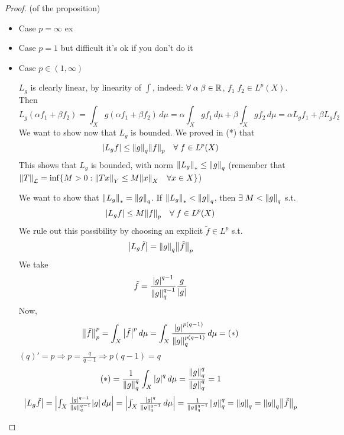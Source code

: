 \begin{proof}
    (of the proposition)
    \begin{itemize}
        \item Case \(p=\infty\) ex
        \item Case \(p=1\) but difficult it's ok if you don't do it
        \item Case \(p \in (1, \infty)\)
        
        \(L_g\) is clearly linear, by linearity of \(\int\), indeed:
        \(\forall \; \alpha \; \beta \in \mathbb{R}\), \(f_1 \; f_2 \in L^p(X)\). Then
        \[
            L_g(\alpha f_1 + \beta f_2) = \int_X g (\alpha f_1 + \beta f_2) \, d\mu = \alpha \int_X g f_1 \, d\mu + \beta \int_X g f_2 \, d\mu = \alpha L_g f_1 + \beta L_g f_2
        \]
        We want to show now that \(L_g \) is bounded. 
        We proved in (*) that 
        \[
            \abs{L_g f} \leq \norm{g}_{{q}} \norm{f}_p \quad \forall \; f \in L^p(X)
        \]
        This shows that \(L_g\) is bounded, with norm  \(\norm{L_g}_* \leq \norm{g}_{{q}}\) (remember that \(\norm{T}_\mathcal{L} = \inf \{ M>0: \norm{Tx} _Y \leq M \norm{x}_X \quad \forall x \in X\} \))

        We want to show that \(\norm{L_g}_* = \norm{g}_{{q}}\). If \(\norm{L_g}_* < \norm{g}_{{q}}\), then \(\exists \; M < \norm{g}_{{q}}\) s.t. 
        \[
            \abs{L_g f } \leq M \norm{f}_p \quad \forall \; f \in L^p(X)
        \]
        We rule out this possibility by choosing an explicit \(\tilde{f} \in L^p \) s.t.
        \[
            \abs{L_g \tilde{f} } = \norm{g}_{{q}} \norm{\tilde{f}}_p
        \]
        We take 
        \[
            \tilde{f} = \frac{\abs{g}^{{q}-1}}{\norm{g}_{{q}}^{{q}-1}} \frac{g}{\abs{g}}
        \]
        Now, 
        \[
            \norm{\tilde{f}}_p^p = \int_X \abs{\tilde{f}}^p \, d\mu = \int_X \frac{\abs{g}^{p({q}-1)}}{\norm{g}_{{q}}^{p({q}-1)}} \, d\mu = (*)
        \]
        \(({q})' = p \Rightarrow p=\frac{{q}}{{q}-1} \Rightarrow p({q}-1) = {q}\)
        \[
            (*) = \frac{1}{\norm{g}_{{q}}^{{q}}} \int_X \abs{g}^{{q}} \, d\mu = \frac{\norm{g}_{{q}}^{{q}}}{\norm{g}_{{q}}^{{q}}} = 1
        \]    
        \[
            \begin{array}{l}
            \abs{L_g \tilde{f}} = \abs{\int_X \frac{\abs{g}^{{q}-1}}{\norm{g}_{{q}}^{{q}-1}} \abs{g} \, d\mu}
            = \abs{\int_X \frac{\abs{g}^{{q}}}{\norm{g}_{{q}}^{{q}-1}} \, d\mu }
            = \frac{1}{\norm{g}^{{q}-1}_{{q}}} \norm{g}_{{q}}^{{q}} 
            = \norm{g}_{{q}} = \norm{g}_{{q}}\norm{\tilde{f}}_p
        \end{array}
            \]
    \end{itemize}
\end{proof}

